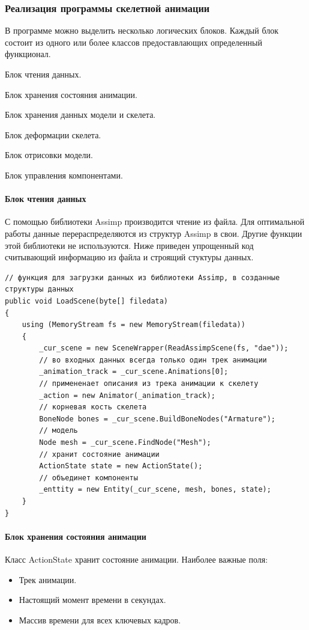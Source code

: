 \subsubsection{Реализация программы скелетной анимации}
В программе можно выделить несколько логических блоков. Каждый блок состоит из одного или более классов предоставлающих определенный функционал.
\begin{my_enumerate}
\item Блок чтения данных.
\item Блок хранения состояния анимации.
\item Блок хранения данных модели и скелета.
\item Блок деформации скелета.
\item Блок отрисовки модели.
\item Блок управления компонентами.
\end{my_enumerate}

\paragraph{Блок чтения данных}
С помощью библиотеки Assimp производится чтение из файла. Для оптимальной работы данные перераспределяются из структур Assimp в свои. Другие функции этой библиотеки не используются.
Ниже приведен упрощенный код считывающий информацию из файла и строящий стуктуры данных.

\begin{scriptsize}
\begin{verbatim}
// функция для загрузки данных из библиотеки Assimp, в созданные структуры данных
public void LoadScene(byte[] filedata)
{
    using (MemoryStream fs = new MemoryStream(filedata))
    {
        _cur_scene = new SceneWrapper(ReadAssimpScene(fs, "dae"));
        // во входных данных всегда только один трек анимации
        _animation_track = _cur_scene.Animations[0];
        // примененает описания из трека анимации к скелету
        _action = new Animator(_animation_track);
        // корневая кость скелета
        BoneNode bones = _cur_scene.BuildBoneNodes("Armature");
        // модель
        Node mesh = _cur_scene.FindNode("Mesh");
        // хранит состояние анимации
        ActionState state = new ActionState();
        // объединет компоненты
        _enttity = new Entity(_cur_scene, mesh, bones, state);
    }
}
\end{verbatim}
\end{scriptsize}


\paragraph{Блок хранения состояния анимации}
Класс ActionState хранит состояние анимации. Наиболее важные поля:
\begin{itemize}
\item Трек анимации.
\item Настоящий момент времени в секундах.
\item Массив времени для всех ключевых кадров.
\end{itemize}

